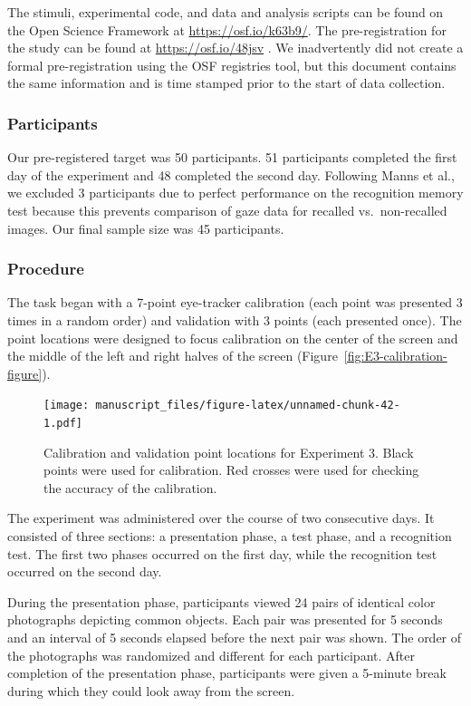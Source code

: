 \documentclass[
  man,floatsintext]{apa6}
\begin{document}
The stimuli, experimental code, and data and analysis scripts can be
found on the Open Science Framework at \url{https://osf.io/k63b9/}.
The pre-registration for the study can be
found at \url{https://osf.io/48jsv} . We
inadvertently did not create a formal pre-registration using the OSF
registries tool, but this document contains the same information and is
time stamped prior to the start of data collection.

\hypertarget{participants-3}{%
\subsubsection{Participants}\label{participants-3}}

Our pre-registered target was 50 participants. 51 participants completed
the first day of the experiment and 48 completed the second day.
Following Manns et al., we excluded 3 participants due to perfect
performance on the recognition memory test because this prevents
comparison of gaze data for recalled vs.~non-recalled images. Our final
sample size was 45 participants.

\hypertarget{procedure-2}{%
\subsubsection{Procedure}\label{procedure-2}}

The task began with a 7-point eye-tracker calibration (each point was
presented 3 times in a random order) and validation with 3 points (each
presented once). The point locations were designed to focus calibration
on the center of the screen and the middle of the left and right halves
of the screen (Figure~\ref{fig:E3-calibration-figure}).

\begin{figure}
\centering
\texttt{[image: manuscript\_files/figure-latex/unnamed-chunk-42-1.pdf]}
\caption{\label{fig:unnamed-chunk-42}Calibration and validation point locations for Experiment 3. Black points were used for calibration. Red crosses were used for checking the accuracy of the calibration.}
\end{figure}

The experiment was administered over the course of two
consecutive days. It consisted of three sections: a presentation phase,
a test phase, and a recognition test. The first two phases occurred on
the first day, while the recognition test occurred on the second day.

During the presentation phase, participants viewed 24 pairs of identical
color photographs depicting common objects. Each pair was presented for
5 seconds and an interval of 5 seconds elapsed before the next pair was
shown. The order of the photographs was randomized and different for
each participant. After completion of the presentation phase,
participants were given a 5-minute break during which they could look
away from the screen.
\end{document}
